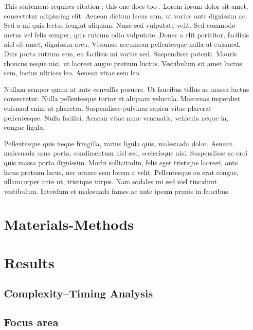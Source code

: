 \documentclass[a4paper, 11pt]{article} %
\begin{document}
This statement requires citation \cite{Smith:2012qr}; this one does too \cite{Smith:2013jd}. Lorem ipsum dolor sit amet, consectetur adipiscing elit. Aenean dictum lacus sem, ut varius ante dignissim ac. Sed a mi quis lectus feugiat aliquam. Nunc sed vulputate velit. Sed commodo metus vel felis semper, quis rutrum odio vulputate. Donec a elit porttitor, facilisis nisl sit amet, dignissim arcu. Vivamus accumsan pellentesque nulla at euismod. Duis porta rutrum sem, eu facilisis mi varius sed. Suspendisse potenti. Mauris rhoncus neque nisi, ut laoreet augue pretium luctus. Vestibulum sit amet luctus sem, luctus ultrices leo. Aenean vitae sem leo.

Nullam semper quam at ante convallis posuere. Ut faucibus tellus ac massa luctus consectetur. Nulla pellentesque tortor et aliquam vehicula. Maecenas imperdiet euismod enim ut pharetra. Suspendisse pulvinar sapien vitae placerat pellentesque. Nulla facilisi. Aenean vitae nunc venenatis, vehicula neque in, congue ligula.

Pellentesque quis neque fringilla, varius ligula quis, malesuada dolor. Aenean malesuada urna porta, condimentum nisl sed, scelerisque nisi. Suspendisse ac orci quis massa porta dignissim. Morbi sollicitudin, felis eget tristique laoreet, ante lacus pretium lacus, nec ornare sem lorem a velit. Pellentesque eu erat congue, ullamcorper ante ut, tristique turpis. Nam sodales mi sed nisl tincidunt vestibulum. Interdum et malesuada fames ac ante ipsum primis in faucibus.


\section*{Materials-Methods}





\section*{Results}

\subsection*{Complexity--Timing Analysis}

\subsection*{Focus area}
\end{document}

